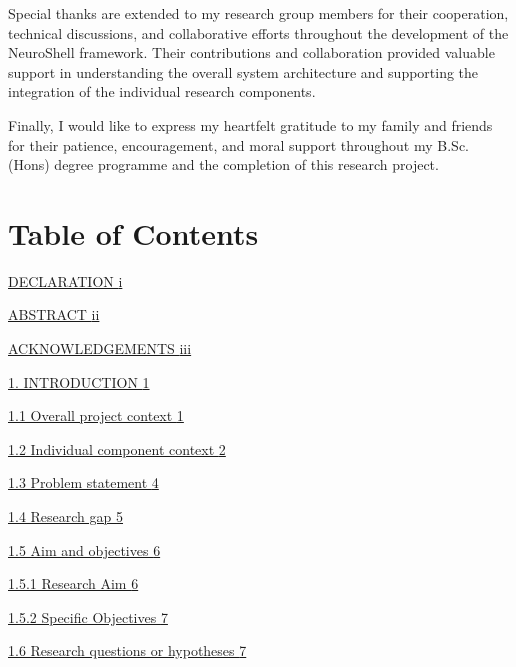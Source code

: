 \documentclass[
]{article}
\begin{document}
Special thanks are extended to my research group members for their
cooperation, technical discussions, and collaborative efforts throughout
the development of the NeuroShell framework. Their contributions and
collaboration provided valuable support in understanding the overall
system architecture and supporting the integration of the individual
research components.

Finally, I would like to express my heartfelt gratitude to my family and
friends for their patience, encouragement, and moral support throughout
my B.Sc. (Hons) degree programme and the completion of this research
project.

\hypertarget{table-of-contents}{%
\section{Table of Contents}\label{table-of-contents}}

\protect\hyperlink{_Toc242376570}{DECLARATION
\protect\hyperlink{_Toc242376570}{i}}

\protect\hyperlink{abstract}{ABSTRACT \protect\hyperlink{abstract}{ii}}

\protect\hyperlink{acknowledgements}{ACKNOWLEDGEMENTS
\protect\hyperlink{acknowledgements}{iii}}

\protect\hyperlink{introduction}{1. INTRODUCTION
\protect\hyperlink{introduction}{1}}

\protect\hyperlink{overall-project-context}{1.1 Overall project context
\protect\hyperlink{overall-project-context}{1}}

\protect\hyperlink{individual-component-context}{1.2 Individual
component context \protect\hyperlink{individual-component-context}{2}}

\protect\hyperlink{problem-statement}{1.3 Problem statement
\protect\hyperlink{problem-statement}{4}}

\protect\hyperlink{research-gap}{1.4 Research gap
\protect\hyperlink{research-gap}{5}}

\protect\hyperlink{aim-and-objectives}{1.5 Aim and objectives
\protect\hyperlink{aim-and-objectives}{6}}

\protect\hyperlink{research-aim}{1.5.1 Research Aim
\protect\hyperlink{research-aim}{6}}

\protect\hyperlink{specific-objectives}{1.5.2 Specific Objectives
\protect\hyperlink{specific-objectives}{7}}

\protect\hyperlink{research-questions-or-hypotheses}{1.6 Research
questions or hypotheses
\protect\hyperlink{research-questions-or-hypotheses}{7}}
\end{document}
